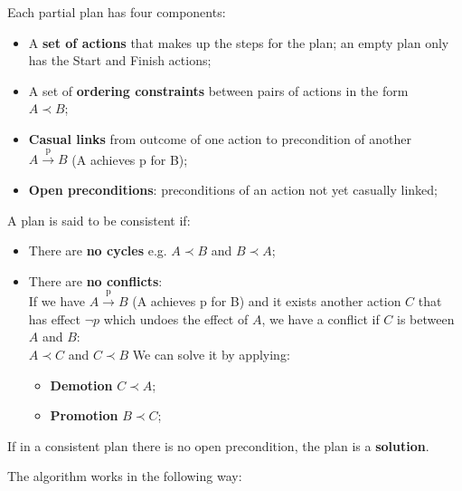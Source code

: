 \documentclass{article}
\begin{document}
\begin{flushleft}
    Each partial plan has four components:
\end{flushleft}

\begin{itemize}
    \item A \textbf{set of actions} that makes up the steps for the plan; an empty plan only has the Start and Finish actions;
    \item A set of \textbf{ordering constraints} between pairs of actions in the form \\ $A \prec B$;
    \item \textbf{Casual links} from outcome of one action to precondition of another \\ $A \xrightarrow{\text{p}} B$ (A achieves p for B);
    \item \textbf{Open preconditions}: preconditions of an action not yet casually linked;

\end{itemize}

A plan is said to be consistent if:

\begin{itemize}
    \item There are \textbf{no cycles}  e.g. $A \prec B$ and $B \prec A$;
    \item There are \textbf{no conflicts}: \\
        If we have $A \xrightarrow{\text{p}} B$ (A achieves p for B) and it exists another action $C$ that has effect $\neg p$ which undoes the effect of $A$, we have a conflict if $C$ is between $A$ and $B$: \\
        $A \prec C$ and $C \prec B$
        We can solve it by applying:
        \begin{itemize}[label=$\bullet$]
            \item \textbf{Demotion} $C \prec A$;
            \item \textbf{Promotion} $B \prec C$;            
        \end{itemize}
\end{itemize}

\begin{flushleft}
    If in a consistent plan there is no open precondition, the plan is a \textbf{solution}.    
\end{flushleft}

\newpage

The algorithm works in the following way:
\end{document}
